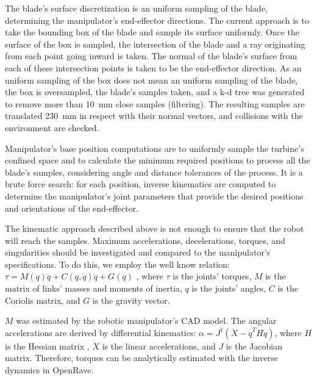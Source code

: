 The blade's surface discretization is an uniform sampling of the blade,
determining the manipulator's end-effector directions. The current approach
is to take the bounding box of the blade and sample its surface uniformly. Once the
surface of the box is sampled, the intersection of the blade and a ray
originating from each point going inward is taken. The normal of the blade's
surface from each of these intersection points is taken to be the end-effector
direction. As an uniform sampling of the box does not mean an uniform sampling
of the blade, the box is oversampled, the blade's samples taken, and a
k-d tree was generated to remove more than 10~mm close samples (filtering). The
resulting samples are translated 230~mm in respect with their normal vectors,
and collisions with the environment are checked.

Manipulator's base position computations are to uniformly sample the turbine's
confined space and to calculate the minimum required positions to process all
the blade's samples, considering angle and distance tolerances of the process.
It is a brute force search: for each position, inverse kinematics are computed
to determine the manipulator's joint parameters that provide the desired
positions and orientations of the end-effector.

The kinematic approach described above is not enough to ensure that the robot
will reach the samples. Maximum accelerations, decelerations,
torques, and singularities should be investigated and compared to the
manipulator's specifications. To do this, we employ the well know relation:
$\tau = M(q)\ddot{q} + C(q,\dot{q})\dot{q} + G(q)$
\cite{sciavicco2000differential}, where $\tau$ is the joints' torques, $M$ is
the matrix of links' masses and moments of inertia, $q$ is the joints' angles,
$C$ is the Coriolis matrix, and $G$ is the gravity vector.

$M$ was estimated by the robotic manipulator's CAD model. The angular
accelerations are derived by differential kinematics:
$\alpha=J^\dagger(\ddot{X}-\dot{q}^TH\dot{q})$, where $H$ is the Hessian matrix
\cite{hourtash2005kinematic}, $\ddot{X}$ is the linear accelerations, and $J$
is the Jacobian matrix. Therefore, torques can be analytically estimated with
the inverse dynamics in OpenRave.

